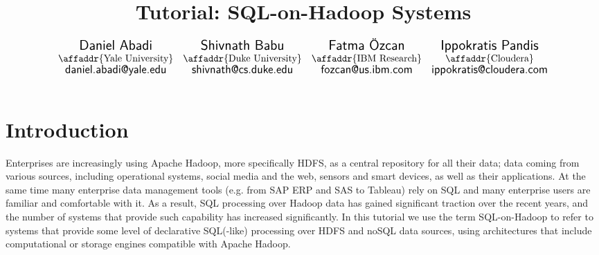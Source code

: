 \documentclass{vldb}
\begin{document}
\title{Tutorial: SQL-on-Hadoop Systems}


\author{
$
\begin{array}{cccc}
  \mbox{\Large \sf Daniel Abadi} &
  \mbox{\Large \sf Shivnath Babu} &
  \mbox{\Large \sf Fatma {\"O}zcan} &
  \mbox{\Large \sf Ippokratis Pandis}\\
  \mbox{\affaddr{Yale University}} &
  \mbox{\affaddr{Duke University}} &
  \mbox{\affaddr{IBM Research}} &
  \mbox{\affaddr{Cloudera}}\\
  \mbox{{\large \sf daniel.abadi@yale.edu}} &
  \mbox{{\large \sf shivnath@cs.duke.edu}} &
  \mbox{{\large \sf fozcan@us.ibm.com}} &
  \mbox{{\large \sf ippokratis@cloudera.com}}
\end{array}
$
\\
}
\maketitle




\section{Introduction}
Enterprises are increasingly using Apache Hadoop, more specifically HDFS, as a central repository for all their data;
data coming from various sources, including operational systems, social media and the web, sensors and smart devices, as well as their applications.
At the same time many enterprise data management tools (e.g. from SAP ERP and SAS to Tableau) rely on SQL and many enterprise users are familiar and comfortable with it.
As a result, SQL processing over Hadoop data has gained significant traction over the recent years, and the number of systems that provide such capability has increased significantly.
In this tutorial we use the term SQL-on-Hadoop to refer to systems that provide some level of declarative SQL(-like) processing over HDFS and noSQL data sources, using architectures that include computational or storage engines compatible with Apache Hadoop. 
\end{document}
